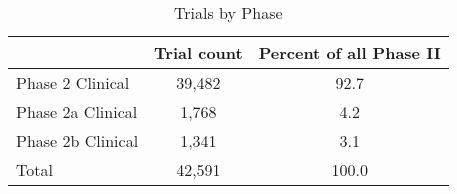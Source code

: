 \begin{table}[htbp]\centering
\def\sym#1{\ifmmode^{#1}\else\(^{#1}\)\fi}
\caption{Trials by Phase}
\begin{tabular}{l*{1}{cc}}
\hline\hline
          &Trial count&Percent of all Phase II\\
\hline
Phase 2 Clinical&   39,482&     92.7\\
Phase 2a Clinical&    1,768&      4.2\\
Phase 2b Clinical&    1,341&      3.1\\
Total     &   42,591&    100.0\\
\hline\hline
\end{tabular}
\end{table}
